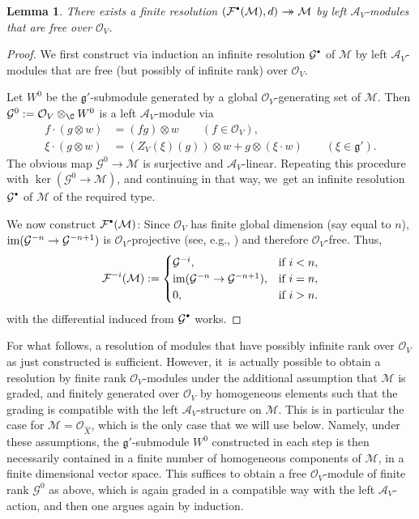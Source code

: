 \documentclass[JEP,XML,SOM,Unicode,published]{cedram}
\newcommand{\onto}{\mathchoice{\to\hspace*{-5mm}\to}{\to\hspace*{-2.85mm}\to}{\to\hspace*{-3mm}\to}{\to\hspace*{-3mm}\to}}
\newcommand{\sbullet}{{\scriptscriptstyle\bullet}}
\newcommand{\csbullet}{{\raisebox{1pt}{$\sbullet$}}}
\newtheorem{lem}[thm]{Lemma}
\newcommand{\cA}{\mathscr{A}}
\newcommand{\cF}{\mathcal{F}}
\newcommand{\cG}{\mathcal{G}}
\newcommand{\cM}{\mathcal{M}}
\newcommand{\cO}{\mathcal{O}}\let\O\cO
\newcommand{\frg}{\mathfrak{g}}
\DeclareMathOperator{\im}{\textup{im}}
\begin{document}
\begin{lem}
There exists a finite resolution $(\cF^{\csbullet}(\cM), d)\onto \cM$ by left $\cA_V$\nobreakdash-mod\-ules that are free over $\cO_V$.
\end{lem}

\begin{proof}
We first construct via induction an infinite resolution $\mathcal{G}^{\csbullet}$ of $\mathcal{M}$ by left $\cA_V$\nobreakdash-mod\-ules that are free (but possibly of infinite rank) over $\mathcal{O}_V$.

Let $W^0$ be the $\mathfrak{g}'$-submodule generated by a global $\mathcal{O}_V$-generating set of $\mathcal{M}$. Then $\mathcal{G}^0:=\mathcal{O}_V\otimes_\C W^0$ is a left $\cA_V$\nobreakdash-mod\-ule via
\begin{align*}
f\cdot (g\otimes w) &= (fg)\otimes w \qquad (f\in \mathcal{O}_V),\\
\xi\cdot (g\otimes w) &= (Z_V(\xi)(g))\otimes w + g \otimes (\xi\cdot w) \qquad (\xi\in \mathfrak{g}').
\end{align*}
The obvious map $\mathcal{G}^0\to \mathcal{M}$ is surjective and $\cA_V$-linear. Repeating this procedure with $\ker(\mathcal{G}^0\to \mathcal{M})$, and continuing in that way, we~get an infinite resolution $\mathcal{G}^{\csbullet}$ of $\mathcal{M}$ of the required type.

We now construct $\mathcal{F}^{\csbullet}(\mathcal{M})$: Since $\mathcal{O}_V$ has finite global dimension (say equal to $n$), $\im(\mathcal{G}^{-n}\to\mathcal{G}^{-n+1})$ is $\mathcal{O}_V$-projective (see, e.g., \cite[\href{https://stacks.math.columbia.edu/tag/00O5}{Lemma 00O5}]{stacks-project}) and therefore $\mathcal{O}_V$-free. Thus,
\[
\mathcal{F}^{-i}(\mathcal{M})
:= 
\begin{cases}
\mathcal{G}^{-i}, &\text{if }i<n,\\
\im(\mathcal{G}^{-n}\to\mathcal{G}^{-n+1}), &\text{if }i=n,\\
0, &\text{if }i>n.
\end{cases}
\]
with the differential induced from $\mathcal{G}^{\csbullet}$ works.
\end{proof}

\begin{rmk}
For what follows, a resolution of modules that have possibly infinite rank over $\cO_V$ as just constructed is sufficient. However, it~is actually possible to obtain a resolution by finite rank $\cO_V$\nobreakdash-mod\-ules under the additional assumption that $\cM$ is graded,
and finitely generated over $\cO_V$ by homogeneous elements such that the grading is compatible with the left $\cA_V$-structure on $\cM$. This is in particular the case for \hbox{$\cM=\cO_{\hat{X}}$}, which is the only case that we will use below. Namely, under these \hbox{assumptions}, the $\frg'$-submodule $W^0$ constructed in each step is then necessarily contained in a finite number of homogeneous components of $\cM$, \ie in a finite dimensional vector space. This suffices to obtain a free $\cO_V$\nobreakdash-mod\-ule of finite rank $\cG^0$ as above,
which is again graded in a compatible way with the left $\cA_V$-action, and then one argues again by induction.
\end{rmk}
\end{document}
